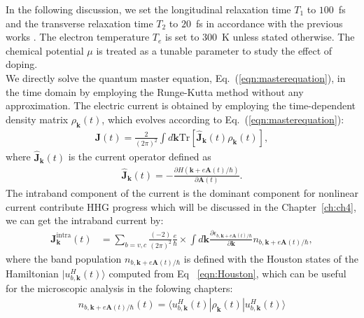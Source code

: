 In the following discussion, we set the longitudinal relaxation time $T_1$ to $100$~fs and the transverse relaxation time $T_2$ to $20$~fs in accordance with the previous works \cite{sato2021nonlinear,sato2021high,sato2019light,sato2019microscopic}. The electron temperature $T_e$ is set to $300$~K unless stated otherwise. The chemical potential $\mu$ is treated as a tunable parameter to study the effect of doping.\\
We directly solve the quantum master equation, Eq.~(\ref{eqn:masterequation}), in the time domain by employing the Runge-Kutta method without any approximation.
The electric current is obtained by employing the time-dependent density matrix $\rho_{\mathbf k}(t)$, which evolves according to Eq.~(\ref{eqn:masterequation}):
\begin{eqnarray}
	\mathbf{J}(t)=\frac{2}{(2\pi)^2} \int d\mathbf k \mathrm{Tr}\left[\hat{\mathbf{J}}_{\mathbf{k}}(t)\rho_{\mathbf{k}}(t)\right],
	\label{eqn:totalcurrent}
\end{eqnarray}
where $\hat{\mathbf{J}}_{\mathbf{k}}(t)$ is the current operator defined as
\begin{align}
	\hat{\mathbf J}_{\mathbf{k}}(t) = -\frac{\partial H(\mathbf{k}+e\mathbf{A}(t)/\hbar)}{\partial \mathbf A(t)}.
	\label{totalcurrent}
\end{align}
The intraband component of the current is the dominant component for nonlinear current contribute
HHG progress which will be discussed in the Chapter~\ref{ch:ch4}, we can get the intraband current by:
\begin{align}
	\mathbf{J}^{\mathrm{intra}}_{\mathbf k}(t) & =\sum_{b=v,c} \frac{(-2)}{(2\pi)^2}
	\frac{e}{\hbar} \nonumber \times
	\int d\mathbf{k}\frac{\partial\epsilon_{b,\mathbf{k}+e\mathbf{A}(t)/\hbar}}{\partial\mathbf{k}} n_{b,\mathbf{k}+e\mathbf{A}(t)/\hbar},
	\label{eqn:intra-steady-current}
\end{align}
where the band population $n_{b,\mathbf{k}+e\mathbf{A}(t)/\hbar}$ is defined with the Houston states of the Hamiltonian $|u^H_{b,\mathbf k} (t)\rangle$ computed from Eq ~\ref{eqn:Houston}, which can be useful for the microscopic analysis in the folowing chapters:
\begin{align}
	n_{b,\mathbf{k}+e\mathbf{A}(t)/\hbar}(t)=\langle u^H_{b,\mathbf k}(t) |\rho_{\mathbf{k}}(t)|u^H_{b,\mathbf k}(t) \rangle
\end{align}


